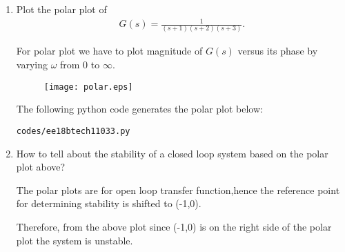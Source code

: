 \begin{enumerate}[label=\thesection.\arabic*.,ref=\thesection.\theenumi]
\item Plot the polar plot of 
\begin{align}
G(s) = \frac{1}{(s+1)(s+2)(s+3)}. 
\end{align}

\solution
For polar plot we have to plot magnitude of $G(s)$ versus its phase
by varying $\omega$ from 0 to $\infty$.


\begin{figure}[!h]
  \texttt{[image: polar.eps]}
  \label{fig:polarplot}
\end{figure}

The following python code generates the polar plot below: 
\begin{lstlisting}
codes/ee18btech11033.py
\end{lstlisting}
\item How to tell about the stability of a closed loop system based on the polar plot above?

\solution
The polar plots are for open loop transfer function,hence the reference point for determining stability is shifted to (-1,0).
Therefore, from the above plot since (-1,0) is on the right side of the polar plot the system is unstable.

\end{enumerate}
